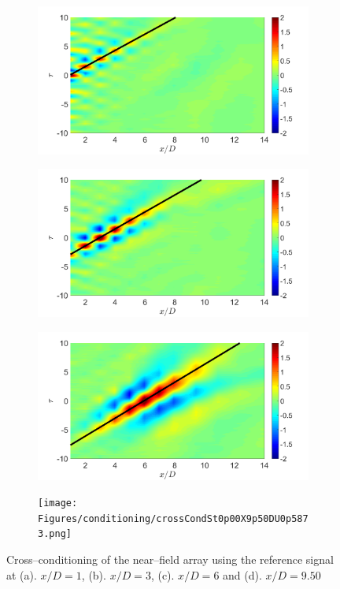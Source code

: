 \begin{figure}
	\centering
		\begin{subfigure}{.5\textwidth}
			\centering
			\includegraphics[width=0.45\linewidth]{Figures/conditioning/crossCondSt0p00X1DU0p7112.png}
			\caption{}
			\label{fig:ch3_farfield_phavg}
		\end{subfigure}%
		\begin{subfigure}{.5\textwidth}
			\centering
			\includegraphics[width=0.45\linewidth]{Figures/conditioning/crossCondSt0p00X3DU0p6806.png}
			\caption{}
			\label{fig:ch3_farfield_phavg}
		\end{subfigure}%
		\begin{subfigure}{.5\textwidth}
			\centering
			\includegraphics[width=0.45\linewidth]{Figures/conditioning/crossCondSt0p00X6DU0p6430.png}
			\caption{}
			\label{fig:ch3_farfield_phavg}
		\end{subfigure}%
		\begin{subfigure}{.5\textwidth}
			\centering
			\texttt{[image: Figures/conditioning/crossCondSt0p00X9p50DU0p5873.png]}
			\caption{}
			\label{fig:ch3_farfield_phavg}
		\end{subfigure}%
	\caption{Cross--conditioning of the near--field array using the reference signal at (a). $x/D = 1$, (b). $x/D=3$, (c). $x/D=6$ and (d). $x/D=9.50$}
	\label{fig:crossCondSt0p00}
\end{figure}
